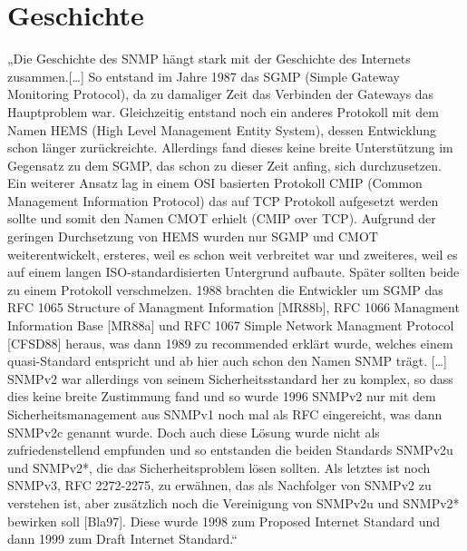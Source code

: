 \documentclass[11pt,a4paper]{article}
\begin{document}
\section{Geschichte}
„Die Geschichte des SNMP hängt stark mit der Geschichte des Internets zusammen.[…]
So entstand im Jahre 1987 das SGMP (Simple Gateway Monitoring Protocol), da zu damaliger Zeit das Verbinden der Gateways das Hauptproblem war. Gleichzeitig entstand noch ein anderes Protokoll mit dem Namen HEMS (High Level Management Entity System), dessen Entwicklung schon länger zurückreichte. Allerdings fand dieses keine breite Unterstützung im Gegensatz zu dem SGMP, das schon zu dieser Zeit anfing, sich durchzusetzen. Ein weiterer Ansatz lag in einem OSI basierten Protokoll CMIP (Common Management Information Protocol) das auf TCP Protokoll aufgesetzt werden sollte und somit den Namen CMOT erhielt (CMIP over TCP). Aufgrund der geringen Durchsetzung von HEMS wurden nur SGMP und CMOT weiterentwickelt, ersteres, weil es schon weit verbreitet war und zweiteres, weil es auf einem langen ISO-standardisierten Untergrund aufbaute. Später sollten beide zu einem Protokoll verschmelzen.
1988 brachten die Entwickler um SGMP das RFC 1065 Structure of Managment Information [MR88b], RFC 1066 Managment Information Base [MR88a] und RFC 1067 Simple Network Managment Protocol [CFSD88] heraus, was dann 1989 zu recommended erklärt wurde, welches einem quasi-Standard entspricht und ab hier auch schon den Namen SNMP trägt. […]
SNMPv2 war allerdings von seinem Sicherheitsstandard her zu komplex, so dass dies keine breite Zustimmung fand und so wurde 1996 SNMPv2 nur mit dem Sicherheitsmanagement aus SNMPv1 noch mal als RFC eingereicht, was dann SNMPv2c genannt wurde. Doch auch diese Lösung wurde nicht als zufriedenstellend empfunden und so entstanden die beiden Standards SNMPv2u und SNMPv2*, die das Sicherheitsproblem lösen sollten.
Als letztes ist noch SNMPv3, RFC 2272-2275, zu erwähnen, das als Nachfolger von SNMPv2 zu verstehen ist, aber zusätzlich noch die Vereinigung von SNMPv2u und SNMPv2* bewirken soll [Bla97]. Diese wurde 1998 zum Proposed Internet Standard und dann 1999 zum Draft Internet Standard.“
\cite{history}
\pagebreak

\end{document}
